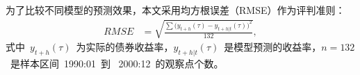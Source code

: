  为了比较不同模型的预测效果，本文采用均方根误差（RMSE）作为评判准则：
 \begin{align}
   RMSE &= \sqrt{\frac{\sum \big(y_{t+h}(\tau)-y_{t+h|t}(\tau)\big)^2}{132}},
 \end{align}
 式中~$y_{t+h}(\tau)$~为实际的债券收益率，$y_{t+h|t}(\tau)$~是模型预测的收益率，$n=132$~是样本区间~1990:01~到~ 2000:12~的观察点个数。


